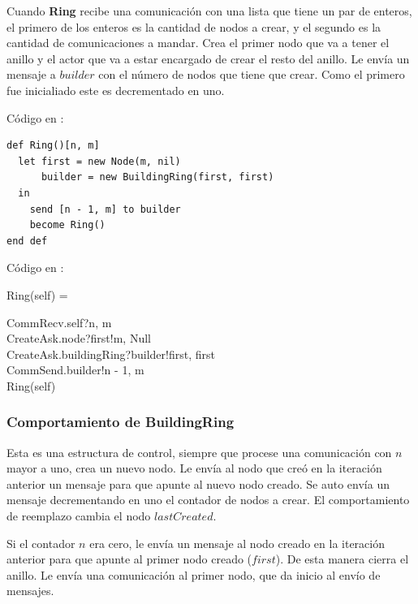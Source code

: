 Cuando \textbf{Ring} recibe una comunicación con una lista que tiene un par de enteros, el primero de los enteros es la cantidad de nodos a crear, y el segundo es la cantidad de comunicaciones a mandar. Crea el primer nodo que va a tener el anillo y el actor que va a estar encargado de crear el resto del anillo. Le envía un mensaje a $builder$ con el número de nodos que tiene que crear. Como el primero fue inicialiado este es decrementado en uno.

Código en \SAL:

\begin{lstlisting}[language=sal, style=simple]
def Ring()[n, m]
  let first = new Node(m, nil)
      builder = new BuildingRing(first, first) 
  in
    send [n - 1, m] to builder
    become Ring() 
end def
\end{lstlisting}

Código en \CSP:

\begin{process}
Ring(self) = \\ \quad
  \begin{block}
  CommRecv.self?\langle n, m \rangle \then \\
  CreateAsk.node?first!\langle m, Null \rangle \then \\
  CreateAsk.buildingRing?builder!\langle first, first \rangle \then \\
  CommSend.builder!\langle n - 1, m\rangle \then \\
  Ring(self)
  \end{block}
\end{process}

\subsubsection*{Comportamiento de BuildingRing}

Esta es una estructura de control, siempre que procese una comunicación con $n$ mayor a uno, crea un nuevo nodo. Le envía al nodo que creó en la iteración anterior un mensaje para que apunte al nuevo nodo creado. Se auto envía un mensaje decrementando en uno el contador de nodos a crear. El comportamiento de reemplazo cambia el nodo $lastCreated$.

Si el contador $n$ era cero, le envía un mensaje al nodo creado en la iteración anterior para que apunte al primer nodo creado ($first$). De esta manera cierra el anillo. Le envía una comunicación al primer nodo, que da inicio al envío de mensajes. 

